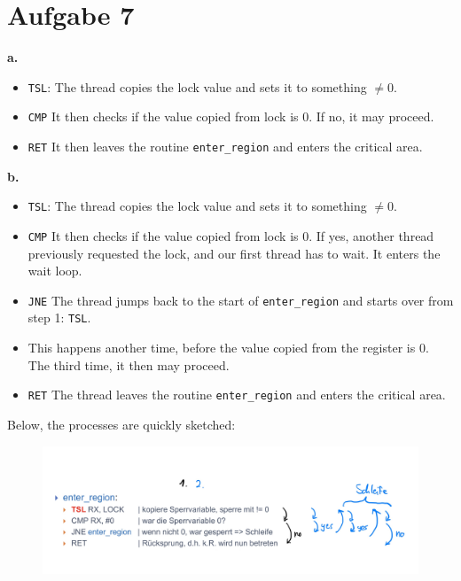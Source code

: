 \documentclass{article}
\begin{document}
\section*{Aufgabe 7}
\textbf{a.}
\begin{itemize}
    \item \texttt{TSL}: The thread copies the lock value and sets it to something \( 
	    \neq 0  \).
    \item \texttt{CMP} It then checks if the value copied from lock is 0. If no, it
       may proceed.
   \item \texttt{RET} It then leaves the routine \texttt{enter\_region} and
      enters the critical area. 
\end{itemize}
\textbf{b.} 
\begin{itemize}
    \item \texttt{TSL}: The thread copies the lock value and sets it to something \( 
	    \neq 0  \).
    \item \texttt{CMP} It then checks if the value copied from lock is 0.
	If yes, another thread previously requested the lock, and our first
	thread has to wait. It enters the wait loop.
	\item \texttt{JNE} The thread jumps back to the start of
	    \texttt{enter\_region} and starts over from step 1: \texttt{TSL}. 
	\item This happens another time, before the value copied from the
	   register is 0. The third time, it then may proceed. 
       \item \texttt{RET} The thread leaves the routine \texttt{enter\_region}
	   and enters the critical area.
\end{itemize}
Below, the processes are quickly sketched:
\begin{figure}[H]
    \centering
    \includegraphics[width=.8\textwidth]{Sketch.jpg}
\end{figure}
\end{document}
